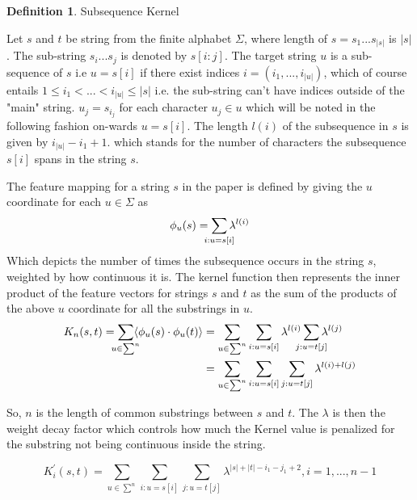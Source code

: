 \documentclass{article}
\theoremstyle{definition}
\newtheorem{definition}{Definition}
\begin{document}
\theoremstyle{definition}
\begin{definition}{Subsequence Kernel}

Let $s$ and $t$ be string from the finite alphabet $\Sigma$, where length of $s=s_1...s_{|s|}$ is $|s|$. The sub-string $s_i...s_j$ is denoted by $s[i:j]$. The target string $u$ is a sub-sequence of $s$ i.e $u=s[i]$ if there exist indices $i=(i_1,...,i_{|u|})$, which of course entails $1 \leq i_1 <...<i_{|u|}\leq|s|$ i.e. the sub-string can't have indices outside of the "main" string. $u_j=s_{i_{j}}$ for each character $u_j \in u$ which will be noted in the following fashion on-wards $u=s[i]$. The length $l(i)$ of the subsequence in $s$ is given by $i_{|u|}-i_{1}+1$. which stands for the number of characters the subsequence $s[i]$ spans in the string $s$.

The feature mapping for a string $s$ in the paper is defined by giving the $u$ coordinate for each $u\in\Sigma$ as
\begin{equation*}
    \phi_u(s)=\sum_{\mathclap{i:u=s[i]}}\lambda^{l(i)}
\end{equation*}
Which depicts the number of times the subsequence occurs in the string $s$, weighted by how continuous it is.
The kernel function then represents the inner product of the feature vectors for strings $s$ and $t$ as the sum of the products of the above $u$ coordinate for all the substrings in $u$.
\begin{align}
    K_n(s,t)=\sum_{\mathclap{u\in\sum^n}}\langle\phi_u(s)\cdot\phi_u(t)\rangle&=\sum\limits_{u\in\sum^n}\sum\limits_{i:u=s[i]}\lambda^{l(i)}\sum_{\mathclap{j:u=t[j]}}\lambda^{l(j)}\\
    &=\sum\limits_{u\in\sum^n}\sum\limits_{i:u=s[i]}\sum\limits_{j:u=t[j]}\lambda^{l(i)+l(j)}
\end{align}

\end{definition}


So, $n$ is the length of common substrings between $s$ and $t$. The $\lambda$ is then the weight decay factor which controls how much the Kernel value is penalized for the substring not being continuous inside the string.

\begin{equation*}
    K_i^{'}(s,t)=\sum\limits_{u\in\sum^n}\sum\limits_{i:u=s[i]}\sum\limits_{j:u=t[j]}\lambda^{|s|+|t|-i_1-j_1+2}   ,i=1,...,n-1
\end{equation*}
\end{document}

